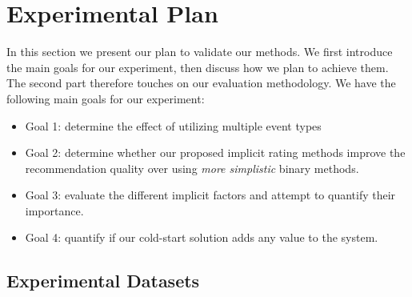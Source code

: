 \clearpage
\section{Experimental Plan}
\label{sec:experimental-plan}


In this section we present our plan to validate our methods. We first introduce
the main goals for our experiment, then discuss how we plan to achieve them.
The second part therefore touches on our evaluation methodology.
We have the following main goals for our experiment:

\begin{itemize}
	\item Goal 1: determine the effect of utilizing multiple event types
	\item Goal 2: determine whether our proposed implicit rating methods improve the recommendation quality over
		  		  using \emph{more simplistic} binary methods.
	\item Goal 3: evaluate the different implicit factors and attempt to quantify their importance.
	\item Goal 4: quantify if our cold-start solution adds any value to the system.
\end{itemize}

\subsection{Experimental Datasets}


